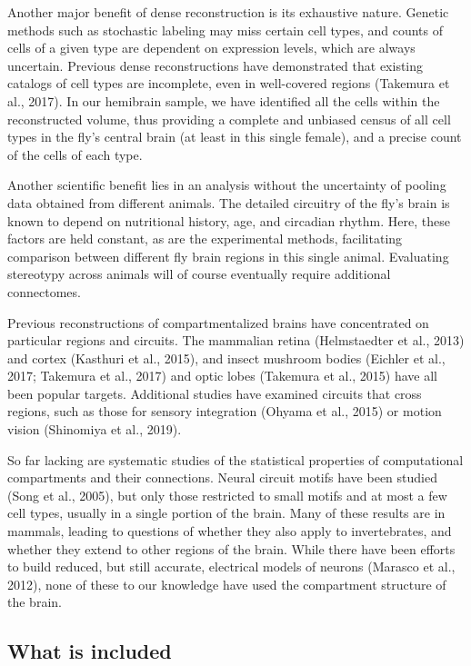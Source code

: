 \documentclass{article}
\begin{document}
Another major benefit of dense reconstruction is its exhaustive nature. Genetic methods such as stochastic labeling may miss certain cell types, and counts of cells of a given type are dependent on expression levels, which are always uncertain. Previous dense reconstructions have demonstrated that existing catalogs of cell types are incomplete, even in well-covered regions (Takemura et al., 2017). In our hemibrain sample, we have identified all the cells within the reconstructed volume, thus providing a complete and unbiased census of all cell types in the fly’s central brain (at least in this single female), and a precise count of the cells of each type.

Another scientific benefit lies in an analysis without the uncertainty of pooling data obtained from different animals. The detailed circuitry of the fly’s brain is known to depend on nutritional history, age, and circadian rhythm. Here, these factors are held constant, as are the experimental methods, facilitating comparison between different fly brain regions in this single animal. Evaluating stereotypy across animals will of course eventually require additional connectomes.

Previous reconstructions of compartmentalized brains have concentrated on particular regions and circuits. The mammalian retina (Helmstaedter et al., 2013) and cortex (Kasthuri et al., 2015), and insect mushroom bodies (Eichler et al., 2017; Takemura et al., 2017) and optic lobes (Takemura et al., 2015) have all been popular targets. Additional studies have examined circuits that cross regions, such as those for sensory integration (Ohyama et al., 2015) or motion vision (Shinomiya et al., 2019).

So far lacking are systematic studies of the statistical properties of computational compartments and their connections. Neural circuit motifs have been studied (Song et al., 2005), but only those restricted to small motifs and at most a few cell types, usually in a single portion of the brain. Many of these results are in mammals, leading to questions of whether they also apply to invertebrates, and whether they extend to other regions of the brain. While there have been efforts to build reduced, but still accurate, electrical models of neurons (Marasco et al., 2012), none of these to our knowledge have used the compartment structure of the brain.

\subsection*{What is included}
\end{document}
